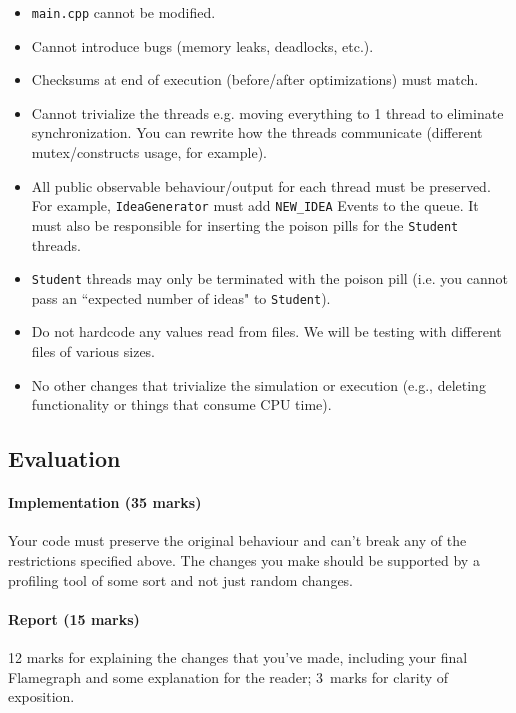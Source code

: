 \documentclass[letterpaper,10pt]{article}
\begin{document}
\begin{itemize}
\item \texttt{main.cpp} cannot be modified.
\item Cannot introduce bugs (memory leaks, deadlocks, etc.).
\item Checksums at end of execution (before/after optimizations) must match.
\item Cannot trivialize the threads e.g. moving everything to 1 thread to
eliminate synchronization. You can rewrite how the threads
communicate (different mutex/constructs usage, for example).
\item All public observable behaviour/output for each thread must be
preserved. For example, \texttt{IdeaGenerator} must add \texttt{NEW\_IDEA} Events to the queue. It must also be responsible for inserting the poison pills for the \texttt{Student} threads.
\item \texttt{Student} threads may only be terminated with the poison pill (i.e. you cannot pass an ``expected number of ideas" to \texttt{Student}).
\item Do not hardcode any values read from files. We will be testing with different files of various sizes.
\item No other changes that trivialize the simulation or execution (e.g., deleting functionality or things that consume CPU time).
\end{itemize}

\subsection{Evaluation}

\paragraph{Implementation (35 marks)} Your code must preserve the original behaviour and can't break any of the restrictions specified above. The changes you make should be supported by a profiling tool of some sort and not just random changes.

\paragraph{Report (15 marks)} 12 marks for explaining the changes that you've made, including your final Flamegraph and some explanation for the reader; 3~marks for clarity of exposition. 
\end{document}
